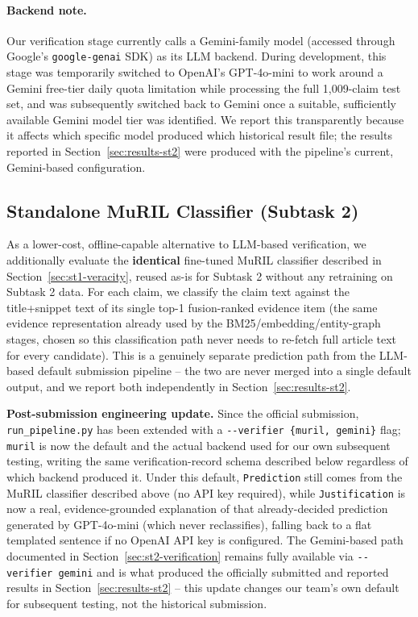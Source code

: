 \documentclass[
]{ceurart}
\begin{document}
\paragraph{Backend note.}
Our verification stage currently calls a Gemini-family model
\cite{geminiteam2023gemini} (accessed through Google's
\texttt{google-genai} SDK) as its LLM backend. During development, this
stage was temporarily switched to OpenAI's GPT-4o-mini
\cite{openai2024gpt4omini} to work around a Gemini free-tier daily
quota limitation while processing the full 1{,}009-claim test set, and
was subsequently switched back to Gemini once a suitable, sufficiently
available Gemini model tier was identified. We report this
transparently because it affects which specific model produced which
historical result file; the results reported in
Section~\ref{sec:results-st2} were produced with the pipeline's
current, Gemini-based configuration.

\subsection{Standalone MuRIL Classifier (Subtask 2)}

As a lower-cost, offline-capable alternative to LLM-based verification,
we additionally evaluate the \textbf{identical} fine-tuned MuRIL
classifier described in Section~\ref{sec:st1-veracity}, reused as-is
for Subtask 2 without any retraining on Subtask 2 data. For each claim,
we classify the claim text against the title+snippet text of its
single top-1 fusion-ranked evidence item (the same evidence
representation already used by the BM25/embedding/entity-graph stages,
chosen so this classification path never needs to re-fetch full
article text for every candidate). This is a genuinely separate
prediction path from the LLM-based default submission pipeline -- the
two are never merged into a single default output, and we report both
independently in Section~\ref{sec:results-st2}.

\textbf{Post-submission engineering update.} Since the official
submission, \texttt{run\_pipeline.py} has been extended with a
\texttt{-{}-verifier \{muril, gemini\}} flag; \texttt{muril} is now the
default and the actual backend used for our own subsequent testing,
writing the same verification-record schema described below regardless
of which backend produced it. Under this default, \texttt{Prediction}
still comes from the MuRIL classifier described above (no API key
required), while \texttt{Justification} is now a real, evidence-grounded
explanation of that already-decided prediction generated by
GPT-4o-mini (which never reclassifies), falling back to a flat
templated sentence if no OpenAI API key is configured. The Gemini-based
path documented in Section~\ref{sec:st2-verification} remains fully
available via \texttt{-{}-verifier gemini} and is what produced the
officially submitted and reported results in
Section~\ref{sec:results-st2} -- this update changes our team's own
default for subsequent testing, not the historical submission.
\end{document}
